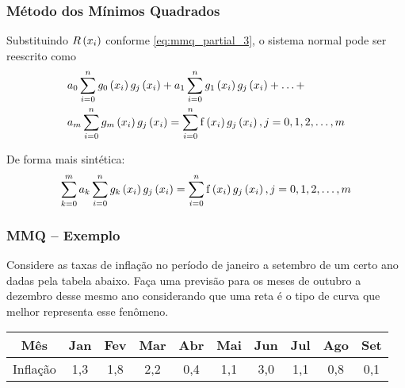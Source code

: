 \begin{frame}
\frametitle{Método dos Mínimos Quadrados}

Substituindo $R\left(x_i\right)$ conforme \cref{eq:mmq_partial_3}, o sistema normal pode ser reescrito como
\begin{align*}
&a_0 \sum_{i=0}^n \G_0\left(\x_i\right) \G_j\left(x_i\right) +
a_1 \sum_{i=0}^n \G_1\left(\x_i\right) \G_j\left(x_i\right) + \ldots +\\
%
&a_m \sum_{i=0}^n \G_m\left(\x_i\right) \G_j\left(x_i\right) =
\sum_{i=0}^n \f\left(\x_i\right) \G_j\left(x_i\right), j = 0,1,2,\ldots,m
\end{align*}%

De forma mais sintética:
\[
\sum_{k=0}^m a_k \sum_{i=0}^n g_k\left(x_i\right) g_j\left(x_i\right) = 
\sum_ {i=0}^n \mathrm{f} \left(x_i\right) g_j\left(x_i\right), j = 0, 1, 2, \ldots, m
\]

\end{frame}

\begin{frame}
\frametitle{MMQ -- Exemplo}

Considere as taxas de inflação no período de janeiro a setembro de um certo ano dadas pela tabela abaixo. Faça uma previsão para os meses de outubro a dezembro desse mesmo ano considerando que uma reta é o tipo de curva que melhor representa esse fenômeno.

\begin{center}
\begin{tabular}{|c|c|c|c|c|c|c|c|c|c|}
\hline
Mês & Jan & Fev & Mar & Abr & Mai & Jun & Jul & Ago & Set\\
\hline
Inflação & 1,3 & 1,8 & 2,2 & 0,4 & 1,1 & 3,0 & 1,1 & 0,8 & 0,1\\
\hline
\end{tabular}
\end{center}

\end{frame}

